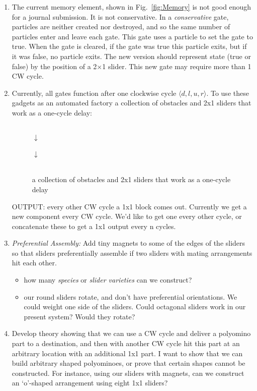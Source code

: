 \documentclass[letterpaper, 10 pt, conference]{ieeeconf}
\begin{document}
\begin{enumerate}
\item The current memory element, shown in Fig.~\ref{fig:Memory} is not good enough for a journal submission. It is not conservative.  In a \emph{conservative} gate, particles
are neither created nor destroyed, and so the same number of particles enter and leave each gate.  This gate uses a particle to set the gate to true.  When the gate is cleared, if the gate was true this particle exits, but if it was false, no particle exits.  The new version should represent state (true or false) by the position of a 2$\times$1 slider.  This new gate may require more than 1 CW cycle.

\item Currently, all gates function after one clockwise cycle $\langle d,l,u,r \rangle$.  To use these gadgets as an automated factory a collection of obstacles and 2x1 sliders that work as a one-cycle delay:\\
\begin{figure}
\begin{centering}
 \\
$\downarrow$\\ 
\\
$\downarrow$\\ 
   \\
\end{centering}
\caption{
\label{fig:onccycledelay}
 a collection of obstacles and 2x1 sliders that work as a one-cycle delay }
\end{figure}

   
OUTPUT:  every other CW cycle a 1x1 block comes out.  Currently we get a new component every CW cycle.  We'd like to get one every other cycle, or concatenate these to get a 1x1 output every n cycles.



\item \emph{Preferential Assembly:}
  Add tiny magnets to some of the edges of the sliders so that sliders preferentially assemble if two sliders with mating arrangements hit each other. 
  \begin{itemize}
  	\item how many \emph{species} or \emph{slider varieties} can we construct?
	\item our round sliders rotate, and don't have preferential orientations.  We could weight one side of the sliders.   Could octagonal sliders work in our present system?  Would they rotate?
	\end{itemize} 
\item Develop theory showing that we can use a CW cycle and deliver a polyomino part to a destination, and then with another CW cycle hit this part at an arbitrary location with an additional 1x1 part.  I want to show that we can build arbitrary shaped polyominoes, or prove that certain shapes cannot be constructed. For instance, using our sliders with magnets, can we construct an `o'-shaped arrangement using eight 1x1 sliders?


\end{enumerate}
\end{document}
